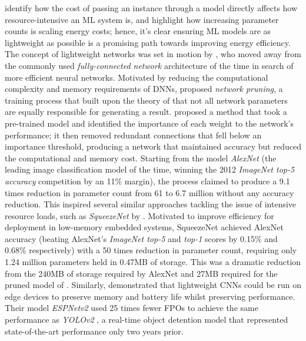 \documentclass[a4paper, 12pt]{article}
\begin{document}
     identify how the cost of passing an instance through a model directly affects how resource-intensive an ML system is, and  highlight how increasing parameter counts is scaling energy costs; hence, it's clear ensuring ML models are as lightweight as possible is a promising path towards improving energy efficiency. The concept of lightweight networks was set in motion by , who moved away from the commonly used \emph{fully-connected network} architecture of the time in search of more efficient neural networks. Motivated by reducing the computational complexity and memory requirements of DNNs,  proposed \emph{network pruning}, a training process that built upon the theory of  that not all network parameters are equally responsible for generating a result.  proposed a method that took a pre-trained model and identified the importance of each weight to the network's performance; it then removed redundant connections that fell below an importance threshold, producing a network that maintained accuracy but reduced the computational and memory cost. Starting from the model \emph{AlexNet} (the leading image classification model of the time, winning the 2012 \emph{ImageNet top-5 accuracy} competition by an 11\% margin), the process claimed to produce a 9.1 times reduction in parameter count from 61 to 6.7 million without any accuracy reduction. This inspired several similar approaches tackling the issue of intensive resource loads, such as \emph{SqueezeNet} by . Motivated to improve efficiency for deployment in low-memory embedded systems, SqueezeNet achieved AlexNet accuracy (beating AlexNet's \emph{ImageNet top-5} and \emph{top-1} scores by 0.15\% and 0.68\% respectively) with a 50 times reduction in parameter count, requiring only 1.24 million parameters held in 0.47MB of storage. This was a dramatic reduction from the 240MB of storage required by AlexNet and 27MB required for the pruned model of . Similarly,  demonstrated that lightweight CNNs could be run on edge devices to preserve memory and battery life whilst preserving performance. Their model \emph{ESPNetv2} used 25 times fewer FPOs to achieve the same performance as \emph{YOLOv2} \cite{redmon-2016}, a real-time object detention model that represented state-of-the-art performance only two years prior.
\end{document}
